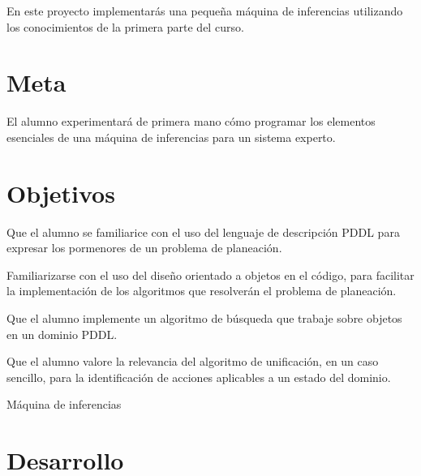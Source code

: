 
En este proyecto implementarás una pequeña máquina de inferencias utilizando los conocimientos de la primera parte del curso.

\section{Meta}

El alumno experimentará de primera mano cómo programar los elementos esenciales de una máquina de inferencias para un sistema experto.

\section{Objetivos}

\begin{compactitem}
 \item Que el alumno se familiarice con el uso del lenguaje de descripción PDDL para expresar
       los pormenores de un problema de planeación.
 \item Familiarizarse con el uso del diseño orientado a objetos en el código, para facilitar
       la implementación de los algoritmos que resolverán el problema de planeación.
 \item Que el alumno implemente un algoritmo de búsqueda que trabaje sobre objetos en un
       dominio PDDL.
 \item Que el alumno valore la relevancia del algoritmo de unificación, en un caso sencillo,
       para la identificación de acciones aplicables a un estado del dominio.
\end{compactitem}


\begin{auxcode}
 \caption{Máquina de inferencias}
 \centering
\end{auxcode}

\section{Desarrollo}

